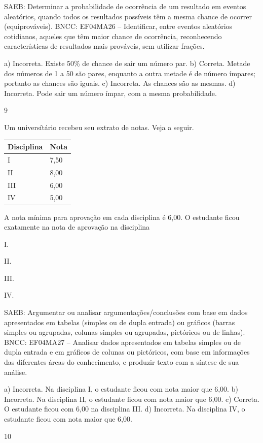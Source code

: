 \begin{mdframed}[linewidth=2pt,linecolor=salmao,roundcorner=2pt]
\begin{escolha}
{\begin{escolha}
SAEB: Determinar a probabilidade de ocorrência de um
resultado em eventos aleatórios, quando todos os resultados possíveis
têm a mesma chance de ocorrer (equiprováveis).
BNCC: EF04MA26 -- Identificar, entre eventos aleatórios cotidianos, aqueles que têm maior chance de
ocorrência, reconhecendo características de resultados mais prováveis, sem utilizar frações.

a) Incorreta. Existe 50\% de chance de sair um número par.
b) Correta. Metade dos números de 1 a 50 são pares, enquanto a outra metade é de número ímpares; portanto as chances são iguais.
c) Incorreta. As chances são as mesmas.
d) Incorreta. Pode sair um número ímpar, com a mesma probabilidade.

\num{9}

Um universítário recebeu seu extrato de notas. Veja a seguir.

\begin{longtable}[]{@{}ll@{}}
\toprule
Disciplina & Nota\tabularnewline
\midrule
\endhead
I & 7,50\tabularnewline
II & 8,00\tabularnewline
III & 6,00\tabularnewline
IV & 5,00\tabularnewline
\bottomrule
\end{longtable}

A nota mínima para aprovação em cada disciplina é 6,00. O estudante ficou exatamente na nota de aprovação na disciplina

\begin{escolha}
\item
  I.
\item
  II.
\item
  III.
\item
  IV.
\end{escolha}

SAEB: Argumentar ou analisar argumentações/conclusões com
base em dados apresentados em tabelas (simples ou de dupla entrada) ou
gráficos (barras simples ou agrupadas, colunas simples ou agrupadas,
pictóricos ou de linhas).
BNCC: EF04MA27 -- Analisar dados apresentados em tabelas simples ou de dupla entrada e em gráficos de
colunas ou pictóricos, com base em informações das diferentes áreas do conhecimento, e produzir
texto com a síntese de sua análise.

a) Incorreta. Na disciplina I, o estudante ficou com nota maior que 6,00.
b) Incorreta. Na disciplina II, o estudante ficou com nota maior que 6,00.
c) Correta. O estudante ficou com 6,00 na disciplina III.
d) Incorreta. Na disciplina IV, o estudante ficou com nota maior que 6,00.

\num{10}


\end{escolha}}
\end{escolha}
\end{mdframed}

